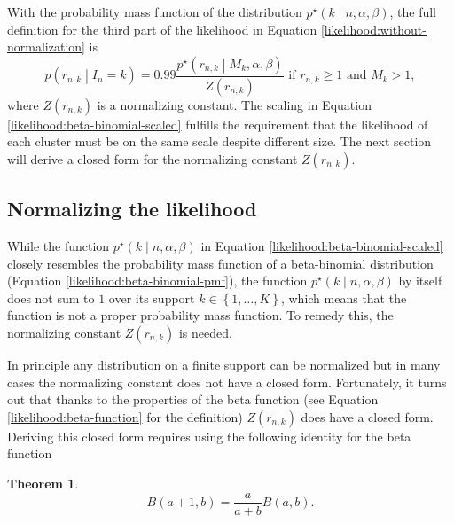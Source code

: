 \documentclass[officiallayout]{tktla}
\newtheorem{theorem}{Theorem}[chapter]
\begin{document}
With the probability mass function of the distribution
$p^{\star}\left(k \middle| n, \alpha, \beta\right)$, the full
definition for the third part of the likelihood in Equation \eqref{likelihood:without-normalization} is
\begin{equation}
  \label{likelihood:normalized}
  p\left(r_{n, k} \middle| I_{n} = k\right) = 0.99\frac{p^{\star}\left(r_{n, k} \middle| M_{k}, \alpha, \beta\right)}{Z\left(r_{n, k}\right)}\text{ if } r_{n, k} \geq 1\text{ and } M_{k} > 1,
\end{equation}
where $Z\left(r_{n, k}\right)$ is a normalizing constant. The scaling
in Equation \eqref{likelihood:beta-binomial-scaled} fulfills the
requirement that the likelihood of each cluster must be on the same
scale despite different size. The next section will derive a closed
form for the normalizing constant $Z\left(r_{n, k}\right)$.

\subsection{Normalizing the likelihood}

While the function $p^{\star}\left(k \middle| n, \alpha, \beta\right)$
in Equation \eqref{likelihood:beta-binomial-scaled} closely resembles
the probability mass function of a beta-binomial distribution
(Equation \eqref{likelihood:beta-binomial-pmf}), the function
$p^{\star}\left(k \middle| n, \alpha, \beta\right)$ by itself does not
sum to $1$ over its support $k \in \left\{ 1, \dots, K \right\}$,
which means that the function is not a proper probability mass
function. To remedy this, the normalizing constant $Z\left(r_{n,
  k}\right)$ is needed.

In principle any distribution on a finite support can be normalized
but in many cases the normalizing constant does not have a closed
form. Fortunately, it turns out that \textemdash{ } thanks to the
properties of the beta function (see Equation
\eqref{likelihood:beta-function} for the definition) \textemdash{ }
$Z\left(r_{n, k}\right)$ does have a closed form. Deriving this closed
form requires using the following identity for the beta function
\begin{theorem}
  \label{lemma:beta-function-identity}
  \[
  B\left(a + 1, b\right) = \frac{a}{a + b}B\left(a, b\right).
  \]
\end{theorem}
\end{document}

